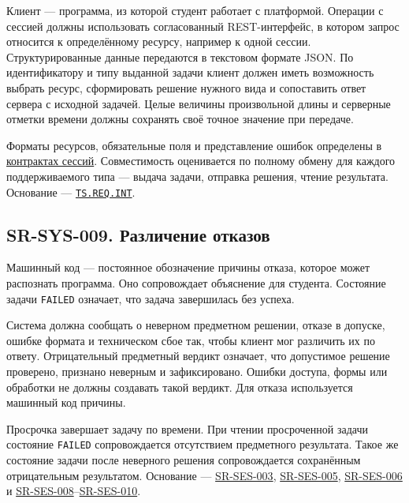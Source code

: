 \documentclass[12pt,a4paper]{article}
\begin{document}
\hypertarget{sr-sys-008}{}

Клиент --- программа, из которой студент работает с платформой. Операции с сессией должны использовать согласованный REST-интерфейс, в котором запрос относится к определённому ресурсу, например к одной сессии. Структурированные данные передаются в текстовом формате JSON. По идентификатору и типу выданной задачи клиент должен иметь возможность выбрать ресурс, сформировать решение нужного вида и сопоставить ответ сервера с исходной задачей. Целые величины произвольной длины и серверные отметки времени должны сохранять своё точное значение при передаче.

Форматы ресурсов, обязательные поля и представление ошибок определены в {\href{../07\_Программные\_требования/DOC-06.2\_Сессии\_задач\_и\_планировщик.pdf\#doc-062-контракты-сессий-задач}{контрактах сессий}}. Совместимость оценивается по полному обмену для каждого поддерживаемого типа --- выдача задачи, отправка решения, чтение результата. Основание --- {\href{../02\_Техническое\_задание/Техническое\_задание.pdf\#ts-req-int}{\texttt{TS.REQ.INT}}}.

\subsection{SR-SYS-009. Различение отказов}\label{sr-sys-009-ux440ux430ux437ux43bux438ux447ux435ux43dux438ux435-ux43eux442ux43aux430ux437ux43eux432}

\hypertarget{sr-sys-009-различение-отказов}{}

\hypertarget{sr-sys-009}{}

Машинный код --- постоянное обозначение причины отказа, которое может распознать программа. Оно сопровождает объяснение для студента. Состояние задачи \texttt{FAILED} означает, что задача завершилась без успеха.

Система должна сообщать о неверном предметном решении, отказе в допуске, ошибке формата и техническом сбое так, чтобы клиент мог различить их по ответу. Отрицательный предметный вердикт означает, что допустимое решение проверено, признано неверным и зафиксировано. Ошибки доступа, формы или обработки не должны создавать такой вердикт. Для отказа используется машинный код причины.

Просрочка завершает задачу по времени. При чтении просроченной задачи состояние \texttt{FAILED} сопровождается отсутствием предметного результата. Такое же состояние задачи после неверного решения сопровождается сохранённым отрицательным результатом. Основание --- {\hyperlink{sr-ses-003}{SR-SES-003}}, {\hyperlink{sr-ses-005}{SR-SES-005}}, {\hyperlink{sr-ses-006}{SR-SES-006}} и {\hyperlink{sr-ses-008}{SR-SES-008}}--{\hyperlink{sr-ses-010}{SR-SES-010}}.
\end{document}
